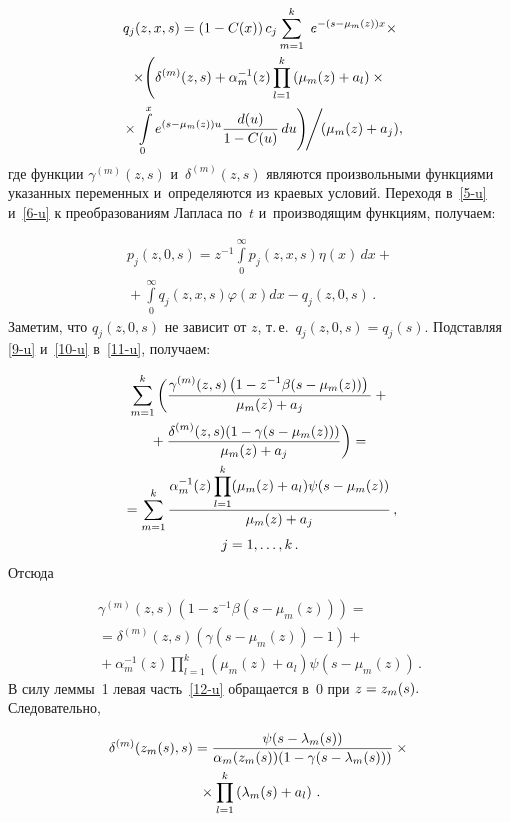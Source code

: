 \begin{multicols}{2}
\noindent
\begin{multline}
q_j(z,x,s)=\left(1-C(x)\right)c_j\sum\limits_{m=1}^k\ e^{-(s-\mu_m(z))x}\times\\
\times
\Bigg(\delta^{(m)}(z,s)+\alpha_m^{-1}(z)\prod\limits_{l=1}^k
\left(\mu_m(z)+a_l\right)\times{}\\
{}\times \int\limits_0^x
e^{(s-\mu_m(z))u} \fr{d(u)}{1-C(u)}\,{du}\Bigg)\! \Bigg/ \!
({\mu_m(z)+a_j}),\!\! \label{10-u}
\end{multline}
где функции $\gamma^{(m)}(z,s)$  и~$\delta^{(m)}(z,s)$ являются 
произвольными функциями указанных переменных и~определяются из краевых условий. 
Переходя в~\eqref{5-u} и~\eqref{6-u} к преобразованиям Лапласа 
по~$t$ и~производящим функциям, получаем:

\noindent
\begin{multline}
\label{11-u}
p_j(z,0,s)=z^{-1}\int\limits_0^{\infty}p_j(z,x,s)\eta(x)\,dx+{}\\
{}+
\int\limits_0^{\infty}q_j(z,x,s)\varphi(x)dx-q_j(z,0,s)\,.
\end{multline}
Заметим, что $q_j(z,0,s)$ не зависит от $z$, т.\,е.\ $q_j(z,0,s)=q_j(s).$
Подставляя \eqref{9-u} и~\eqref{10-u} в~\eqref{11-u}, получаем:

\noindent
\begin{multline*}
\sum\limits_{m=1}^k
\bigg(\displaystyle\frac{\displaystyle \gamma^{(m)}(z,s)\left(1-z^{-1}\beta(s-\mu_m(z))\right)\mathstrut}{\displaystyle \mu_m(z)+a_j\mathstrut}+{}\\
{}+
\displaystyle\frac{\displaystyle \delta^{(m)}(z,s)(1-\gamma(s-\mu_m(z)))\mathstrut}{\displaystyle \mu_m(z)+a_j\mathstrut}\bigg)
={}\\
{}=\sum\limits_{m=1}^k\displaystyle\frac{\displaystyle \alpha_m^{-1}(z)\prod\limits_{l=1}^k(\mu_m(z)+a_l)\psi(s-\mu_m(z))\mathstrut}{\displaystyle \mu_m(z)+a_j\mathstrut}\,,\\ 
j=1,\ldots,k\,.
\end{multline*}
Отсюда

\noindent
\begin{multline}
\label{12-u}
\gamma^{(m)}(z,s)\left(1-z^{-1}\beta(s-\mu_m(z))\right)={}\\
{}=\delta^{(m)}(z,s)\left(\gamma(s-\mu_m(z))-1\right)+{}\\
{}+
\alpha_m^{-1}(z)\prod\limits_{l=1}^k(\mu_m(z)+a_l)\psi\left(s-\mu_m(z)\right)\,.
\end{multline}
В силу леммы~1 левая часть~\eqref{12-u} обращается в~0 при $z\hm=z_m(s).$ 
Следовательно,

\noindent
\begin{multline}
\label{13-u}
\delta^{(m)}(z_m(s),s)=
\displaystyle\frac{\displaystyle \psi(s-\lambda_m(s))\mathstrut}{\displaystyle \alpha_m(z_m(s))(1-\gamma(s-\lambda_m(s)))\mathstrut}\times{}\\
{}\times
\prod\limits_{l=1}^k\left(\lambda_m(s)+a_l\right)\,.
\end{multline}


\end{multicols}
